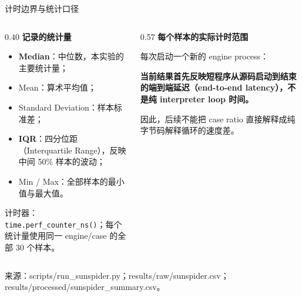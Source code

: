 \documentclass[aspectratio=169,10pt]{beamer}
\newcommand{\sourcenote}[1]{%
  {\color{NoteGray}\fontsize{6.7}{8}\selectfont #1}%
}
\newcommand{\code}[1]{\texttt{#1}}
\begin{document}
\begin{frame}{计时边界与统计口径}
\fontsize{8.8}{10.3}\selectfont

\begin{columns}[T,onlytextwidth]
\begin{column}{0.40\textwidth}
  \textbf{记录的统计量}
  \begin{itemize}\setlength{\itemsep}{0.14em}\setlength{\parskip}{0pt}
    \item \textbf{Median}：中位数，本实验的主要统计量；
    \item Mean：算术平均值；
    \item Standard Deviation：样本标准差；
    \item \textbf{IQR}：四分位距（Interquartile Range），反映中间 50\% 样本的波动；
    \item Min / Max：全部样本的最小值与最大值。
  \end{itemize}

  \vspace{0.12cm}
  计时器：\code{time.perf\_counter\_ns()}；每个统计量使用同一 engine/case 的全部 30 个样本。
\end{column}

\begin{column}{0.57\textwidth}
  \textbf{每个样本的实际计时范围}

  每次启动一个新的 engine process：

  \vspace{0.12cm}
  \begin{center}
  \end{center}

  \vspace{0.20cm}
  \colorbox{SoftBlue}{%
    \parbox{0.91\linewidth}{%
      \vspace{0.13cm}
      \textbf{当前结果首先反映短程序从源码启动到结束的端到端延迟（end-to-end latency），不是纯 interpreter loop 时间。}
      \vspace{0.13cm}%
    }%
  }

  \vspace{0.18cm}
  因此，后续不能把 case ratio 直接解释成纯字节码解释循环的速度差。
\end{column}
\end{columns}

\vfill
\sourcenote{来源：scripts/run\_sunspider.py；results/raw/sunspider.csv；results/processed/sunspider\_summary.csv。}
\end{frame}
\end{document}
